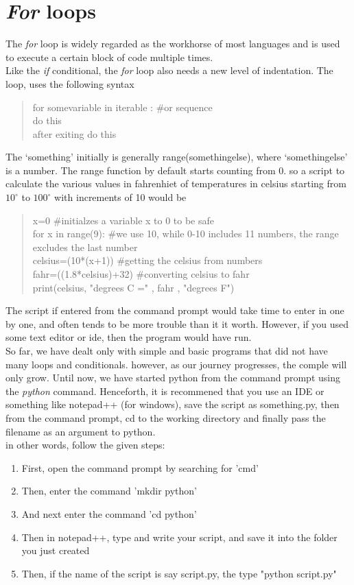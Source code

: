 \section{\emph{For} loops}
The \emph{for} loop is widely regarded as the workhorse of most languages and is used to execute a certain block of code multiple times.\\
Like the \emph{if} conditional, the \emph{for} loop also needs a new level of indentation. The loop, uses the following syntax
\begin{quote}
for somevariable in iterable : \#or sequence\\
\tab do this\\
after exiting do this
\end{quote}
The `something' initially is generally range(somethingelse), where `somethingelse' is a number. The range function by default starts counting from 0.
so a script to calculate the various values in fahrenhiet of temperatures in celsius starting from $10^\circ$ to $100^\circ$ with increments of 10 would be
\begin{quote}
x=0 \tab \#initialzes a variable x to 0 to be safe\\
for x in range(9): \tab \#we use 10, while 0-10 includes 11 numbers, the range excludes the last number\\
\tab celsius=(10*(x+1)) \tab \#getting the celsius from numbers\\
\tab fahr=((1.8*celsius)+32) \tab \#converting celsius to fahr\\
\tab print(celsius, "degrees C =" , fahr , "degrees F")
\end{quote}
The script if entered from the command prompt would take time to enter in one by one, and often tends to be more trouble than it it worth. However, if you used some text editor or ide, then the program would have run.\\
So far, we have dealt only with simple and basic programs that did not have many loops and conditionals. however, as our journey progresses, the comple will only grow. Until now, we have started python from the command prompt using the \emph{python} command. Henceforth, it is recommened that you use an IDE or something like notepad++ (for windows), save the script as something.py, then from the command prompt, cd to the working directory and finally pass the filename as an argument to python.\\ 
in other words, follow the given steps:
\begin{enumerate}
\item First, open the command prompt by searching for 'cmd'
\item  Then, enter the command 'mkdir python'
\item And next enter the command 'cd python'
\item Then in notepad++, type and write your script, and save it into the folder you just created
\item Then, if the name of the script is say script.py, the type "python script.py"
\end{enumerate}
\newpage
